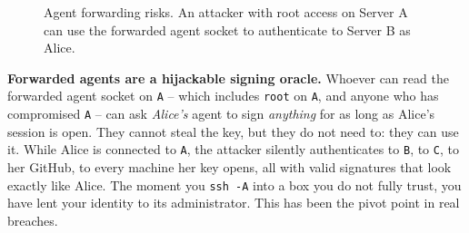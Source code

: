 \begin{figure}[htbp]
\centering
{}
\caption{Agent forwarding risks. An attacker with root access on Server A can use the forwarded agent socket to authenticate to Server B as Alice.}
\label{fig:ssh-agent-forwarding}
\end{figure}

\begin{attackbox}
\textbf{Forwarded agents are a hijackable signing oracle.} Whoever can read the forwarded agent socket on \texttt{A} -- which includes \texttt{root} on \texttt{A}, and anyone who has compromised \texttt{A} -- can ask \emph{Alice's} agent to sign \emph{anything} for as long as Alice's session is open. They cannot steal the key, but they do not need to: they can use it. While Alice is connected to \texttt{A}, the attacker silently authenticates to \texttt{B}, to \texttt{C}, to her GitHub, to every machine her key opens, all with valid signatures that look exactly like Alice. The moment you \texttt{ssh -A} into a box you do not fully trust, you have lent your identity to its administrator. This has been the pivot point in real breaches.
\end{attackbox}

